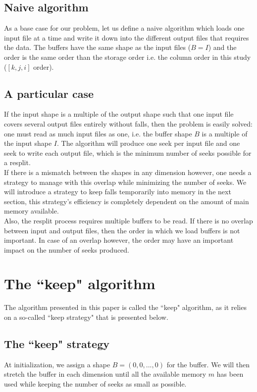 \documentclass[conference]{IEEEtran}
\begin{document}
\subsection{Naive algorithm}

As a base case for our problem, let us define a naive algorithm which loads one input file at a time and write it down into the different output files that requires the data.
The buffers have the same shape as the input files ($B=I$) and the order is the same order than the storage order i.e. the column order in this study ($[k, j, i]$ order).

\subsection{A particular case}

If the input shape is a multiple of the output shape such that one input file covers several output files entirely without falls, then the problem is easily solved: one must read as much input files as one, i.e. the buffer shape $B$ is a multiple of the input shape $I$.
The algorithm will produce one seek per input file and one seek to write each output file, which is the minimum number of seeks possible for a resplit.\\

If there is a mismatch between the shapes in any dimension however, one needs a strategy to manage with this overlap while minimizing the number of seeks.
We will introduce a strategy to keep falls temporarily into memory in the next section, this strategy's efficiency is completely dependent on the amount of main memory available. \\

Also, the resplit process requires multiple buffers to be read.
If there is no overlap between input and output files, then the order in which we load buffers is not important.
In case of an overlap however, the order may have an important impact on the number of seeks produced.

\section*{The ``keep" algorithm}
The algorithm presented in this paper is called the ``keep" algorithm, as it relies on a so-called ``keep strategy" that is presented below.

\subsection{The ``keep" strategy}
At initialization, we assign a shape $B = (0, 0,..., 0)$ for the buffer.
We will then stretch the buffer in each dimension until all the available memory $m$ has been used while keeping the number of seeks as small as possible. \\
\end{document}
